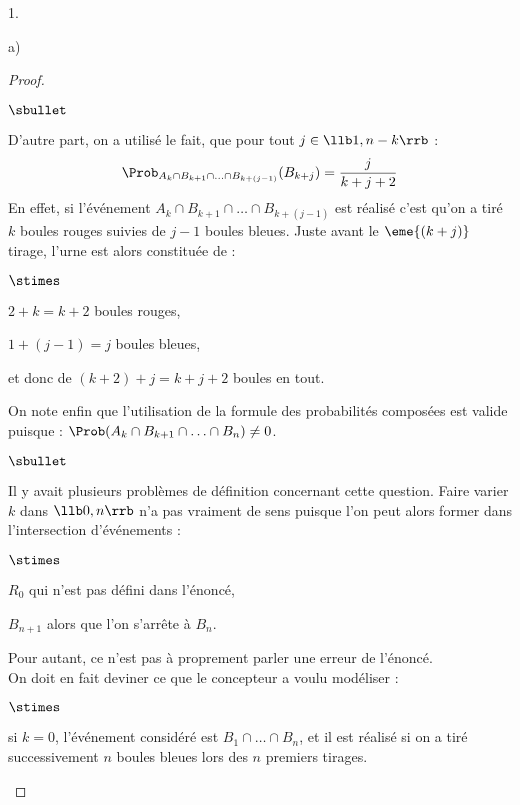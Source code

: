 \documentclass[11pt]{article}%
\begin{document}
\begin{noliste}{1.}
\begin{noliste}{a)}
\begin{proof}
\begin{noliste}{$\sbullet$}
      \item D'autre part, on a utilisé le fait, que pour tout $j \in
        \llb 1, n-k \rrb$ :
        \[
        \Prob_{A_k \cap B_{k+1} \cap \ldots \cap B_{k+(j-1)}}(B_{k+j})
        = \dfrac{j}{k+j+2}
        \]
        En effet, si l'événement $A_k \cap B_{k+1} \cap \ldots \cap
        B_{k+(j-1)}$ est réalisé c'est qu'on a tiré $k$
        boules rouges suivies de $j-1$ boules bleues. Juste avant le
        $\eme{(k+j)}$ tirage, l'urne est alors constituée de :
        \begin{noliste}{$\stimes$}
        \item $2 + k = k+2$ boules rouges,
        \item $1 + (j-1) = j$ boules bleues,
        \item et donc de $(k+2) + j = k + j + 2$ boules en tout.
        \end{noliste}

      \item On note enfin que l'utilisation de la formule des
        probabilités composées est valide puisque : $\Prob(A_k \cap
        B_{k+1} \cap \ldots \cap B_{n}) \neq 0$.
      \end{noliste}
      \begin{remark}
        \begin{noliste}{$\sbullet$}
        \item Il y avait plusieurs problèmes de définition concernant
          cette question. Faire varier $k$ dans $\llb 0,n \rrb$ n'a
          pas vraiment de sens puisque l'on peut alors former dans
          l'intersection d'événements :
          \begin{noliste}{$\stimes$}
          \item $R_0$ qui n'est pas défini dans l'énoncé,
          \item $B_{n+1}$ alors que l'on s'arrête à $B_n$.
          \end{noliste}

        \item Pour autant, ce n'est pas à proprement parler une erreur
          de l'énoncé.\\
          On doit en fait deviner ce que le concepteur a voulu
          modéliser :
          \begin{noliste}{$\stimes$}
          \item si $k = 0$, l'événement considéré est $B_1 \cap \ldots
            \cap B_n$, et il est réalisé si on a tiré successivement
            $n$ boules bleues lors des $n$ premiers tirages.


\end{noliste}
\end{noliste}
\end{remark}
\end{proof}
\end{noliste}
\end{noliste}
\end{document}
